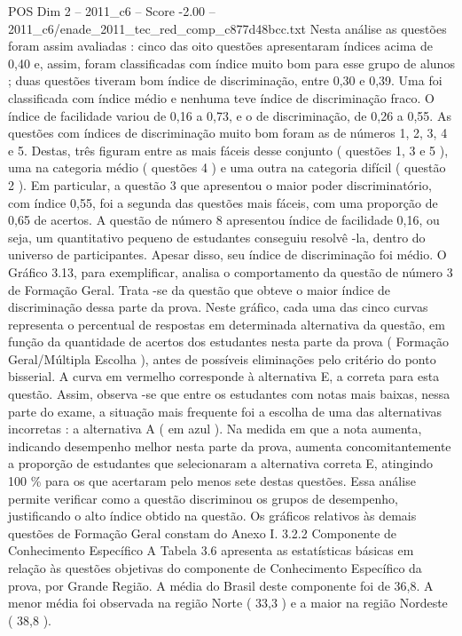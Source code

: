 \begin{textsample}{POS Dim 2 – 2011\_c6 – Score -2.00 – 2011\_c6/enade\_2011\_tec\_red\_comp\_c877d48bcc.txt}
Nesta análise as questões foram assim avaliadas : cinco das oito questões apresentaram índices acima de 0,40 e, assim, foram classificadas com índice muito bom para esse grupo de alunos ; duas questões tiveram bom índice de discriminação, entre 0,30 e 0,39.
Uma foi classificada com índice médio e nenhuma teve índice de discriminação fraco.
O índice de facilidade variou de 0,16 a 0,73, e o de discriminação, de 0,26 a 0,55.
As questões com índices de discriminação muito bom foram as de números 1, 2, 3, 4 e 5.
Destas, três figuram entre as mais fáceis desse conjunto ( questões 1, 3 e 5 ), uma na categoria médio ( questões 4 ) e uma outra na categoria difícil ( questão 2 ).
Em particular, a questão 3 que apresentou o maior poder discriminatório, com índice 0,55, foi a segunda das questões mais fáceis, com uma proporção de 0,65 de acertos.
A questão de número 8 apresentou índice de facilidade 0,16, ou seja, um quantitativo pequeno de estudantes conseguiu resolvê -la, dentro do universo de participantes.
Apesar disso, seu índice de discriminação foi médio.
O Gráfico 3.13, para exemplificar, analisa o comportamento da questão de número 3 de Formação Geral.
Trata -se da questão que obteve o maior índice de discriminação dessa parte da prova.
Neste gráfico, cada uma das cinco curvas representa o percentual de respostas em determinada alternativa da questão, em função da quantidade de acertos dos estudantes nesta parte da prova ( Formação Geral/Múltipla Escolha ), antes de possíveis eliminações pelo critério do ponto bisserial.
A curva em vermelho corresponde à alternativa E, a correta para esta questão.
Assim, observa -se que entre os estudantes com notas mais baixas, nessa parte do exame, a situação mais frequente foi a escolha de uma das alternativas incorretas : a alternativa A ( em azul ).
Na medida em que a nota aumenta, indicando desempenho melhor nesta parte da prova, aumenta concomitantemente a proporção de estudantes que selecionaram a alternativa correta E, atingindo 100 \% para os que acertaram pelo menos sete destas questões.
Essa análise permite verificar como a questão discriminou os grupos de desempenho, justificando o alto índice obtido na questão.
Os gráficos relativos às demais questões de Formação Geral constam do Anexo I. 3.2.2 Componente de Conhecimento Específico A Tabela 3.6 apresenta as estatísticas básicas em relação às questões objetivas do componente de Conhecimento Específico da prova, por Grande Região.
A média do Brasil deste componente foi de 36,8.
A menor média foi observada na região Norte ( 33,3 ) e a maior na região Nordeste ( 38,8 ).

\end{textsample}
